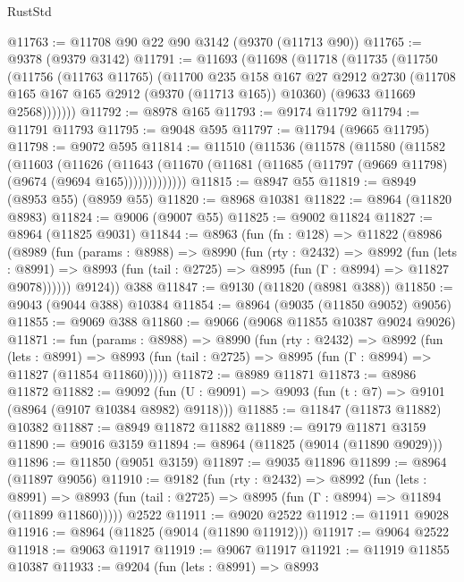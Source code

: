 \begin{lexlean}{RustStd}
\begin{coremodule}
@11763 := @11708 @90 @22 @90 @3142 (@9370 (@11713 @90))
@11765 := @9378 (@9379 @3142)
@11791 := @11693
    (@11698
      (@11718
        (@11735
          (@11750
            (@11756
              (@11763 @11765)
              (@11700
                @235
                @158
                @167
                @27
                @2912
                @2730
                (@11708 @165 @167 @165 @2912 (@9370 (@11713 @165)) @10360)
                (@9633 @11669 @2568)))))))
@11792 := @8978 @165
@11793 := @9174 @11792
@11794 := @11791 @11793
@11795 := @9048 @595
@11797 := @11794 (@9665 @11795)
@11798 := @9072 @595
@11814 := @11510
    (@11536
      (@11578
        (@11580
          (@11582
            (@11603
              (@11626
                (@11643
                  (@11670 (@11681 (@11685 (@11797 (@9669 @11798) (@9674 (@9694 @165)))))))))))))
@11815 := @8947 @55
@11819 := @8949 (@8953 @55) (@8959 @55)
@11820 := @8968 @10381
@11822 := @8964 (@11820 @8983)
@11824 := @9006 (@9007 @55)
@11825 := @9002 @11824
@11827 := @8964 (@11825 @9031)
@11844 := @8963
    (fun (fn : @128) =>
    @11822
      (@8986
        (@8989
          (fun (params : @8988) =>
          @8990
            (fun (rty : @2432) =>
            @8992
              (fun (lets : @8991) =>
              @8993 (fun (tail : @2725) => @8995 (fun (Γ : @8994) => @11827 @9078))))))
        @9124))
    @388
@11847 := @9130 (@11820 (@8981 @388))
@11850 := @9043 (@9044 @388) @10384
@11854 := @8964 (@9035 (@11850 @9052) @9056)
@11855 := @9069 @388
@11860 := @9066 (@9068 @11855 @10387 @9024 @9026)
@11871 := fun (params : @8988) =>
  @8990
    (fun (rty : @2432) =>
    @8992
      (fun (lets : @8991) =>
      @8993 (fun (tail : @2725) => @8995 (fun (Γ : @8994) => @11827 (@11854 @11860)))))
@11872 := @8989 @11871
@11873 := @8986 @11872
@11882 := @9092
    (fun (U : @9091) => @9093 (fun (t : @7) => @9101 (@8964 (@9107 @10384 @8982) @9118)))
@11885 := @11847 (@11873 @11882) @10382
@11887 := @8949 @11872 @11882
@11889 := @9179 @11871 @3159
@11890 := @9016 @3159
@11894 := @8964 (@11825 (@9014 (@11890 @9029)))
@11896 := @11850 (@9051 @3159)
@11897 := @9035 @11896
@11899 := @8964 (@11897 @9056)
@11910 := @9182
    (fun (rty : @2432) =>
    @8992
      (fun (lets : @8991) =>
      @8993 (fun (tail : @2725) => @8995 (fun (Γ : @8994) => @11894 (@11899 @11860)))))
    @2522
@11911 := @9020 @2522
@11912 := @11911 @9028
@11916 := @8964 (@11825 (@9014 (@11890 @11912)))
@11917 := @9064 @2522
@11918 := @9063 @11917
@11919 := @9067 @11917
@11921 := @11919 @11855 @10387
@11933 := @9204
    (fun (lets : @8991) =>
    @8993

\end{coremodule}
\end{lexlean}
